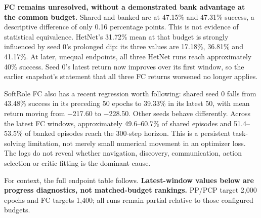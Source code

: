 \documentclass[
  10pt,
]{article}
\begin{document}
\textbf{FC remains unresolved, without a demonstrated bank advantage at
the common budget.} Shared and banked are at 47.15\% and 47.31\%
success, a descriptive difference of only 0.16 percentage points. This
is not evidence of statistical equivalence. HetNet's 31.72\% mean at
that budget is strongly influenced by seed 0's prolonged dip: its three
values are 17.18\%, 36.81\% and 41.17\%. At later, unequal endpoints,
all three HetNet runs reach approximately 40\% success. Seed 0's latest
return now improves over its first window, so the earlier snapshot's
statement that all three FC returns worsened no longer applies.

SoftRole FC also has a recent regression worth following: shared seed 0
falls from 43.48\% success in its preceding 50 epochs to 39.33\% in its
latest 50, with mean return moving from −217.60 to −228.50. Other seeds
behave differently. Across the latest FC windows, approximately
49.6--60.7\% of shared episodes and 51.4--53.5\% of banked episodes
reach the 300-step horizon. This is a persistent task-solving
limitation, not merely small numerical movement in an optimizer loss.
The logs do not reveal whether navigation, discovery, communication,
action selection or critic fitting is the dominant cause.

For context, the full endpoint table follows. \textbf{Latest-window
values below are progress diagnostics, not matched-budget rankings.}
PP/PCP target 2,000 epochs and FC targets 1,400; all runs remain partial
relative to those configured budgets.
\end{document}

